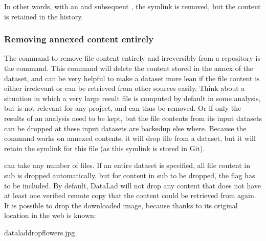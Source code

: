 \sphinxAtStartPar
In other words, with an  and subsequent ,
the symlink is removed, but the content is retained in the history.

\ignorespaces 

\subsubsection{Removing annexed content entirely}
\label{\detokenize{basics/101-136-filesystem:removing-annexed-content-entirely}}\label{\detokenize{basics/101-136-filesystem:remove}}\label{\detokenize{basics/101-136-filesystem:index-8}}
\sphinxAtStartPar
The command to remove file content entirely and irreversibly from a repository is
the  command.
This command will delete the content stored in the annex of the dataset,
and can be very helpful to make a dataset more lean if the file content is
either irrelevant or can be retrieved from other sources easily. Think about a
situation in which a very large result file is computed by default
in some analysis, but is not relevant for any project, and can thus be removed.
Or if only the results of an analysis need to be kept, but the file contents from
its input datasets can be dropped at these input datasets are backed\sphinxhyphen{}up else
where. Because the command works on annexed contents, it will drop file 
from a dataset, but it will retain the symlink for this file (as this symlink
is stored in Git).

\sphinxAtStartPar
{} can take any number of files.
If an entire dataset is specified, all file content in sub\sphinxhyphen{} is
dropped automatically, but for content in sub\sphinxhyphen{} to be dropped, the
 flag has to be included.
By default, DataLad will not drop any content that does not have at least
one verified remote copy that the content could be retrieved from again.
It is possible to drop the downloaded image, because thanks to
 its original location in the web is known:

\begin{sphinxVerbatim}[commandchars=\\\{\}]
dataladdropflowers.jpg
\end{sphinxVerbatim}

